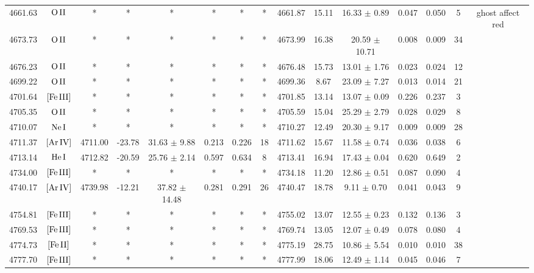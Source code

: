 \documentclass{article}
\begin{document}
\begin{table*}
\begin{adjustbox}{width=\textwidth}
\begin{tabular}{ccccccccccccccc}
4661.63 & $\mbox{O}\thinspace \mbox{II}$ & * & * & * & * & * & * & 4661.87 & 15.11 & 16.33 $\pm$ 0.89 & 0.047 & 0.050 & 5 &  ghost affect red \\
4673.73 & $\mbox{O}\thinspace \mbox{II}$ & * & * & * & * & * & * & 4673.99 & 16.38 & 20.59 $\pm$ 10.71 & 0.008 & 0.009 & 34 &  \\
4676.23 & $\mbox{O}\thinspace \mbox{II}$ & * & * & * & * & * & * & 4676.48 & 15.73 & 13.01 $\pm$ 1.76 & 0.023 & 0.024 & 12 &  \\
4699.22 & $\mbox{O}\thinspace \mbox{II}$ & * & * & * & * & * & * & 4699.36 & 8.67 & 23.09 $\pm$ 7.27 & 0.013 & 0.014 & 21 &  \\
4701.64 & $\mbox{[Fe}\thinspace \mbox{III]}$ & * & * & * & * & * & * & 4701.85 & 13.14 & 13.07 $\pm$ 0.09 & 0.226 & 0.237 & 3 &  \\
4705.35 & $\mbox{O}\thinspace \mbox{II}$ & * & * & * & * & * & * & 4705.59 & 15.04 & 25.29 $\pm$ 2.79 & 0.028 & 0.029 & 8 &  \\
4710.07 & $\mbox{Ne}\thinspace \mbox{I}$ & * & * & * & * & * & * & 4710.27 & 12.49 & 20.30 $\pm$ 9.17 & 0.009 & 0.009 & 28 &  \\
4711.37 & $\mbox{[Ar}\thinspace \mbox{IV]}$ & 4711.00 & -23.78 & 31.63 $\pm$ 9.88 & 0.213 & 0.226 & 18 & 4711.62 & 15.67 & 11.58 $\pm$ 0.74 & 0.036 & 0.038 & 6 &  \\
4713.14 & $\mbox{He}\thinspace \mbox{I}$ & 4712.82 & -20.59 & 25.76 $\pm$ 2.14 & 0.597 & 0.634 & 8 & 4713.41 & 16.94 & 17.43 $\pm$ 0.04 & 0.620 & 0.649 & 2 &  \\
4734.00 & $\mbox{[Fe}\thinspace \mbox{III]}$ & * & * & * & * & * & * & 4734.18 & 11.20 & 12.86 $\pm$ 0.51 & 0.087 & 0.090 & 4 &  \\
4740.17 & $\mbox{[Ar}\thinspace \mbox{IV]}$ & 4739.98 & -12.21 & 37.82 $\pm$ 14.48 & 0.281 & 0.291 & 26 & 4740.47 & 18.78 & 9.11 $\pm$ 0.70 & 0.041 & 0.043 & 9 &  \\
4754.81 & $\mbox{[Fe}\thinspace \mbox{III]}$ & * & * & * & * & * & * & 4755.02 & 13.07 & 12.55 $\pm$ 0.23 & 0.132 & 0.136 & 3 &  \\
4769.53 & $\mbox{[Fe}\thinspace \mbox{III]}$ & * & * & * & * & * & * & 4769.74 & 13.05 & 12.07 $\pm$ 0.49 & 0.078 & 0.080 & 4 &  \\
4774.73 & $\mbox{[Fe}\thinspace \mbox{II]}$ & * & * & * & * & * & * & 4775.19 & 28.75 & 10.86 $\pm$ 5.54 & 0.010 & 0.010 & 38 &  \\
4777.70 & $\mbox{[Fe}\thinspace \mbox{III]}$ & * & * & * & * & * & * & 4777.99 & 18.06 & 12.49 $\pm$ 1.14 & 0.045 & 0.046 & 7 &  \\

\end{tabular}
\end{adjustbox}
\end{table*}
\end{document}
